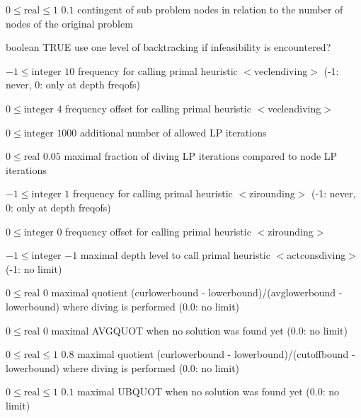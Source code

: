 %
{$0\leq\textrm{real}\leq1$}%
{$0.1$}%
{contingent of sub problem nodes in relation to the number of nodes of the original problem}%
{}

%
{boolean}%
{TRUE}%
{use one level of backtracking if infeasibility is encountered?}%
{}

%
{$-1\leq\textrm{integer}$}%
{$10$}%
{frequency for calling primal heuristic $<$veclendiving$>$ (-1: never, 0: only at depth freqofs)}%
{}

%
{$0\leq\textrm{integer}$}%
{$4$}%
{frequency offset for calling primal heuristic $<$veclendiving$>$}%
{}

%
{$0\leq\textrm{integer}$}%
{$1000$}%
{additional number of allowed LP iterations}%
{}

%
{$0\leq\textrm{real}$}%
{$0.05$}%
{maximal fraction of diving LP iterations compared to node LP iterations}%
{}

%
{$-1\leq\textrm{integer}$}%
{$1$}%
{frequency for calling primal heuristic $<$zirounding$>$ (-1: never, 0: only at depth freqofs)}%
{}

%
{$0\leq\textrm{integer}$}%
{$0$}%
{frequency offset for calling primal heuristic $<$zirounding$>$}%
{}

%
{$-1\leq\textrm{integer}$}%
{$-1$}%
{maximal depth level to call primal heuristic $<$actconsdiving$>$ (-1: no limit)}%
{}

%
{$0\leq\textrm{real}$}%
{$0$}%
{maximal quotient (curlowerbound - lowerbound)/(avglowerbound - lowerbound) where diving is performed (0.0: no limit)}%
{}

%
{$0\leq\textrm{real}$}%
{$0$}%
{maximal AVGQUOT when no solution was found yet (0.0: no limit)}%
{}

%
{$0\leq\textrm{real}\leq1$}%
{$0.8$}%
{maximal quotient (curlowerbound - lowerbound)/(cutoffbound - lowerbound) where diving is performed (0.0: no limit)}%
{}

%
{$0\leq\textrm{real}\leq1$}%
{$0.1$}%
{maximal UBQUOT when no solution was found yet (0.0: no limit)}%
{}

